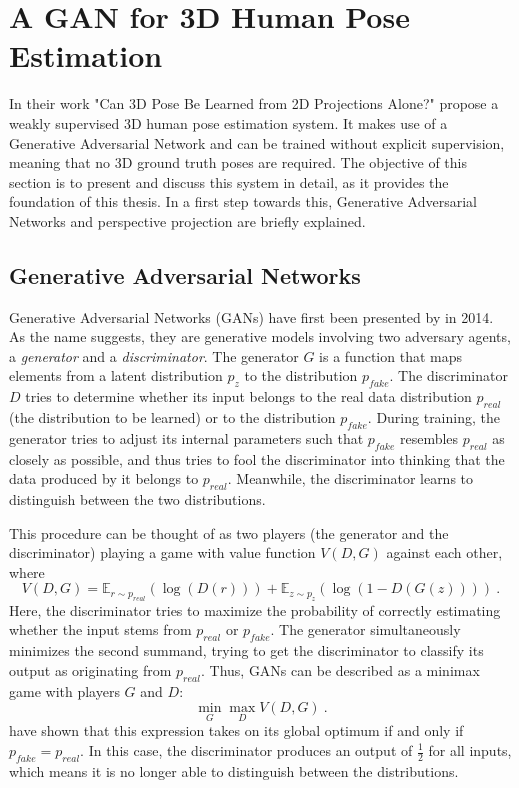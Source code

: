 \section{A GAN for 3D Human Pose Estimation}
\label{sec:network}
In their work "Can 3D Pose Be Learned from 2D Projections Alone?" \citet{drover18} propose a weakly supervised 3D human pose estimation system.
It makes use of a Generative Adversarial Network and can be trained without explicit supervision, meaning that no 3D ground truth poses are required.
The objective of this section is to present and discuss this system in detail, as it provides the foundation of this thesis.
In a first step towards this, Generative Adversarial Networks and perspective projection are  briefly explained.

\subsection{Generative Adversarial Networks}
Generative Adversarial Networks (GANs) have first been presented by \citet{goodfellow14} in 2014.
As the name suggests, they are generative models involving two adversary agents, a \emph{generator} and a \emph{discriminator}.
The generator $G$ is a function that maps elements from a latent distribution $p_z$ to the distribution $p_{fake}$.
The discriminator $D$ tries to determine whether its input belongs to the real data distribution $p_{real}$ (the distribution to be learned) or to the distribution $p_{fake}$.
During training, the generator tries to adjust its internal parameters such that $p_{fake}$ resembles $p_{real}$ as closely as possible, and thus tries to fool the discriminator into thinking that the data produced by it belongs to $p_{real}$.
Meanwhile, the discriminator learns to distinguish between the two distributions.

This procedure can be thought of as two players (the generator and the discriminator) playing a game with value function $V(D, G)$ against each other, where
\begin{equation}
	V(D, G) = \mathbb{E}_{r\sim p_{real}}(\log(D(r))) + \mathbb{E}_{z\sim p_{z}}(\log(1 - D(G(z)))) \ .
\end{equation}
Here, the discriminator tries to maximize the probability of correctly estimating whether the input stems from $p_{real}$ or $p_{fake}$.
The generator simultaneously minimizes the second summand, trying to get the discriminator to classify its output as originating from $p_{real}$.
Thus, GANs can be described as a minimax game with players $G$ and $D$:
\begin{equation}
\min_G \max_D V(D, G) \ .
\end{equation}
\citet{goodfellow14} have shown that this expression takes on its global optimum if and only if $p_{fake} = p_{real}$.
In this case, the discriminator produces an output of $\frac{1}{2}$ for all inputs, which means it is no longer able to distinguish between the distributions.

